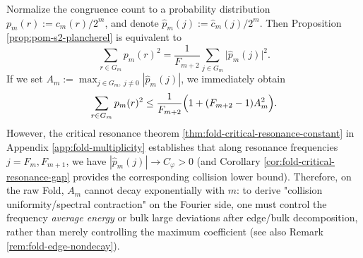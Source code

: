 \begin{remark}\label{rem:pom-max-fourier-obstruction}
Normalize the congruence count to a probability distribution \(p_m(r):=c_m(r)/2^m\), and denote \(\widehat p_m(j):=\widehat c_m(j)/2^m\).
Then Proposition \ref{prop:pom-s2-plancherel} is equivalent to
\[
\sum_{r\in G_m}p_m(r)^2=\frac{1}{F_{m+2}}\sum_{j\in G_m}\bigl|\widehat p_m(j)\bigr|^2.
\]
If we set \(A_m:=\max_{j\in G_m,\ j\neq 0}|\widehat p_m(j)|\), we immediately obtain
\[
\sum_{r\in G_m}p_m(r)^2\le \frac{1}{F_{m+2}}\Bigl(1+(F_{m+2}-1)A_m^2\Bigr).
\]
However, the critical resonance theorem \ref{thm:fold-critical-resonance-constant} in Appendix \ref{app:fold-multiplicity} establishes that along resonance frequencies \(j=F_m,F_{m+1}\), we have
\(
|\widehat p_m(j)|\to C_\varphi>0
\)
(and Corollary \ref{cor:fold-critical-resonance-gap} provides the corresponding collision lower bound).
Therefore, on the raw Fold, \(A_m\) cannot decay exponentially with \(m\): to derive "collision uniformity/spectral contraction" on the Fourier side, one must control the frequency \emph{average energy} or bulk large deviations after edge/bulk decomposition, rather than merely controlling the maximum coefficient (see also Remark \ref{rem:fold-edge-nondecay}).
\end{remark}

